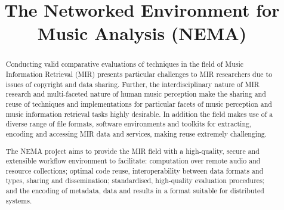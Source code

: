 \documentclass[conference]{IEEEtran}
\begin{document}
%
\title{The Networked Environment for Music Analysis (NEMA)}



\author{
}


\maketitle

\begin{abstract}
Conducting valid comparative evaluations of techniques in the field of Music Information Retrieval (MIR) presents particular challenges to MIR researchers due to issues of copyright and data sharing. Further, the interdisciplinary nature of MIR research and multi-faceted nature of human music perception make the sharing and reuse of techniques and implementations for particular facets of music perception and music information retrieval tasks highly desirable. In addition the field makes use of a diverse range of file formats, software environments and toolkits for extracting, encoding and accessing MIR data and services, making reuse extremely challenging. 


The NEMA project aims to provide the MIR field with a high-quality, secure and extensible workflow environment to facilitate: computation over remote audio and resource collections; optimal code reuse, interoperability between data formats and types, sharing and dissemination; standardised, high-quality evaluation procedures; and the encoding of metadata, data and results in a format suitable for distributed systems.

\end{abstract}
\end{document}
